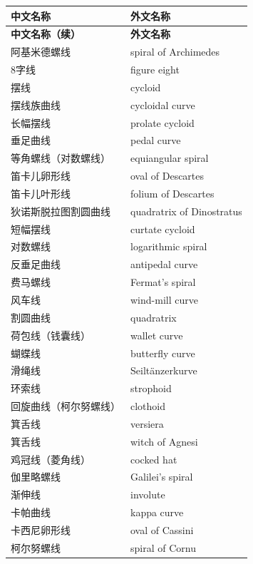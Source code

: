 {\small
\renewcommand{\arraystretch}{1.18}
\begin{longtable}{@{}>{\raggedright\arraybackslash}p{45mm}@{\hspace{5mm}}>{\raggedright\arraybackslash}p{52mm}@{}}
  \toprule
  \textbf{中文名称} & \textbf{外文名称} \\
  \midrule
  \endfirsthead
  \toprule
  \textbf{中文名称（续）} & \textbf{外文名称} \\
  \midrule
  \endhead
  \bottomrule
  \endfoot
  \bottomrule
  \endlastfoot
  阿基米德螺线 & spiral of Archimedes \\
  8字线 & figure eight \\
  摆线 & cycloid \\
  摆线族曲线 & cycloidal curve \\
  长幅摆线 & prolate cycloid \\
  垂足曲线 & pedal curve \\
  等角螺线（对数螺线） & equiangular spiral \\
  笛卡儿卵形线 & oval of Descartes \\
  笛卡儿叶形线 & folium of Descartes \\
  狄诺斯脱拉图割圆曲线 & quadratrix of Dinostratus \\
  短幅摆线 & curtate cycloid \\
  对数螺线 & logarithmic spiral \\
  反垂足曲线 & antipedal curve \\
  费马螺线 & Fermat's spiral \\
  风车线 & wind-mill curve \\
  割圆曲线 & quadratrix \\
  荷包线（钱囊线） & wallet curve \\
  蝴蝶线 & butterfly curve \\
  滑绳线 & Seiltänzerkurve \\
  环索线 & strophoid \\
  回旋曲线（柯尔努螺线） & clothoid \\
  箕舌线 & versiera \\
  箕舌线 & witch of Agnesi \\
  鸡冠线（菱角线） & cocked hat \\
  伽里略螺线 & Galilei's spiral \\
  渐伸线 & involute \\
  卡帕曲线 & kappa curve \\
  卡西尼卵形线 & oval of Cassini \\
  柯尔努螺线 & spiral of Cornu \\

\end{longtable}}
